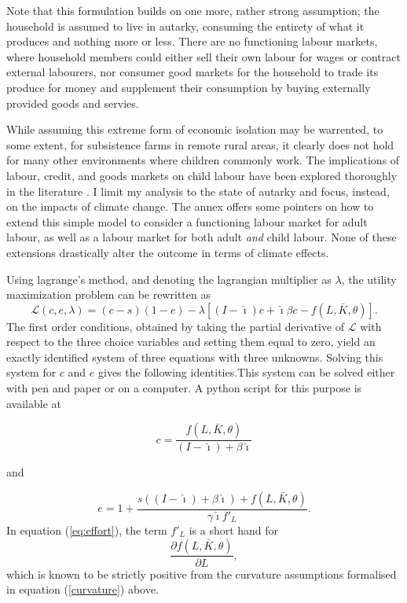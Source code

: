 \documentclass[a4paper,12pt]{article}
\theoremstyle{plain}
\theoremstyle{definition}
\theoremstyle{definition}
\theoremstyle{definition}
\theoremstyle{definition}
\begin{document}
Note that this formulation builds on one more, rather strong assumption; the household is assumed to live in autarky, consuming the entirety of what it produces and nothing more or less. There are no functioning labour markets, where household members could either sell their own labour for wages or contract external labourers, nor consumer good markets for the household to trade its produce for money and supplement their consumption by buying externally provided goods and servies.

While assuming this extreme form of economic isolation may be warrented, to some extent, for subsistence farms in remote rural areas, it clearly does not hold for many other environments where children commonly work. The implications of labour, credit, and goods markets on child labour have been explored thoroughly in the literature \citep[see e.g.,][]{Baland2000, Bhalotra2003,Dumas2013, Dumas2015, Dumas2020}. I limit my analysis to the state of autarky and focus, instead, on the impacts of climate change. The annex offers some pointers on how to extend this simple model to consider a functioning labour market for adult labour, as well as a labour market for both adult \textit{and} child labour. None of these extensions drastically alter the outcome in terms of climate effects.

Using lagrange's method, and denoting the lagrangian multiplier as $\lambda$, the utility maximization problem can be rewritten as
\begin{equation}
\label{lagrange}
    \mathcal{L}(c,e,\lambda)=(c-s)(1-e) -\lambda \left[(I-\hat{\imath})c+\hat{\imath}\beta c - f(L,\bar{K},\theta)\right].
\end{equation}
The first order conditions, obtained by taking the partial derivative of $\mathcal{L}$ with respect to the three choice variables and setting them equal to zero, yield an exactly identified system of three equations with three unknowns. Solving this system for $c$ and $e$ gives the following identities.\footnotesize{This system can be solved either with pen and paper or on a computer. A python script for this purpose is available at }

\begin{equation}
\label{eq:consumption}
    c=\frac{f(L, \bar{K}, \theta)}{(I-\hat{\imath})+\beta \hat{\imath}}
\end{equation}

and

\begin{equation}
\label{eq:effort}
    e=1+\frac{s((I-\hat{\imath})+\beta \hat{\imath})+f(L,\bar{K},\theta)}{\gamma \hat{\imath} f'_L}.
\end{equation}
In equation (\ref{eq:effort}), the term $f'_L$  is a short hand for
\begin{equation*}
    \frac{\partial f(L,\bar{K},\theta)}{\partial L},
\end{equation*}
which is known to be strictly positive from the curvature assumptions formalised in equation (\ref{curvature}) above.
\end{document}

